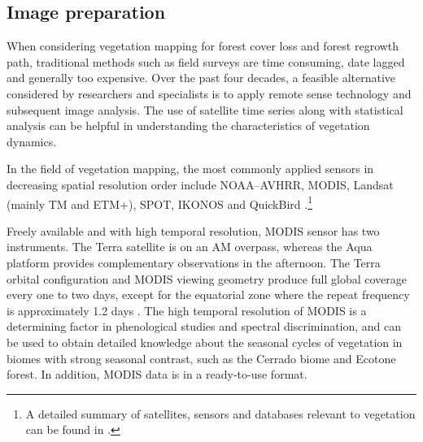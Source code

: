 \subsection{Image preparation}  %

When considering vegetation mapping for forest cover loss and forest regrowth path, traditional methods such as field surveys are time consuming, date lagged and generally too expensive. Over the past four decades, a feasible alternative considered by researchers and specialists is to apply remote sense technology and subsequent image analysis. The use of satellite time series along with statistical analysis can be helpful in understanding the characteristics of vegetation dynamics.


In the field of vegetation mapping, the most commonly applied sensors in decreasing spatial resolution order include NOAA–AVHRR, MODIS, Landsat (mainly TM and ETM+), SPOT, IKONOS  and QuickBird \citep{xie_sha_yu_2008}.\footnote{A detailed summary of satellites, sensors and databases relevant to vegetation can be found in \citet{horning_2010}.}


Freely available and with high temporal resolution, MODIS sensor has two instruments. The Terra satellite is on an AM overpass, whereas the Aqua platform provides complementary observations in the afternoon. The Terra orbital configuration and MODIS viewing geometry produce full global coverage every one to two days, except for the equatorial zone where the repeat frequency is approximately 1.2 days \citep{zhan_2002, setiawan_2014}. The high temporal resolution of MODIS is a determining factor in phenological studies and spectral discrimination, and can be used to obtain detailed knowledge about the seasonal cycles of vegetation in biomes with strong seasonal contrast, such as the Cerrado biome and Ecotone forest. In addition, MODIS data is in a ready-to-use format.

